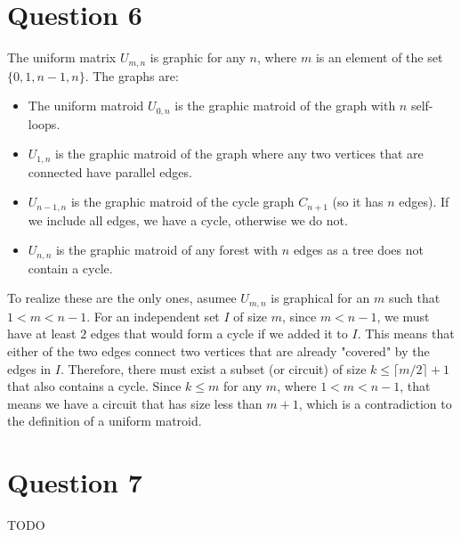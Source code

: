 \documentclass[a4paper, fleqn]{article}
\begin{document}
\section*{Question 6}
The uniform matrix $U_{m,n}$ is graphic for any $n$, where $m$ is an element of the set $\{0,1,n-1, n\}$. The graphs are:
\begin{itemize}
  \item The uniform matroid $U_{0,n}$ is the graphic matroid of the graph with $n$ self-loops.
  \item $U_{1,n}$ is the graphic matroid of the graph where any two vertices that are connected have parallel edges.
  \item $U_{n-1, n}$ is the graphic matroid of the cycle graph $C_{n+1}$ (so it has $n$ edges). If we include all edges, we have a cycle, otherwise we do not.
  \item $U_{n,n}$ is the graphic matroid of any forest with $n$ edges as a tree does not contain a cycle.
\end{itemize}
To realize these are the only ones, asumee $U_{m,n}$ is graphical for an $m$ such that $1<m<n-1$. For an independent set $I$ of size $m$, since $m<n-1$, we must have at least $2$ edges that would form a cycle if we added it to $I$. This means that either of the two edges connect two vertices that are already "covered" by the edges in $I$. Therefore, there must exist a subset (or circuit) of size $k\leq \lceil m/2\rceil +1$ that also contains a cycle. Since $k \leq m$ for any $m$, where $1<m<n-1$, that means we have a circuit that has size less than $m+1$, which is a contradiction to the definition of a uniform matroid.

\section*{Question 7}
TODO
\end{document}
